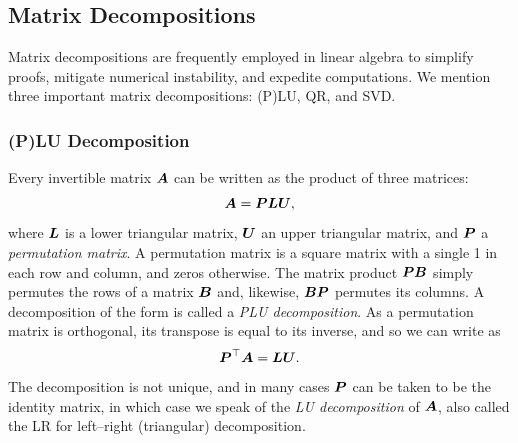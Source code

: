 \subsection{Matrix Decompositions}
Matrix decompositions are frequently employed in linear algebra to simplify proofs, mitigate numerical instability, and expedite computations. We mention three important matrix decompositions: (P)LU, QR, and SVD.

\subsubsection{(P)LU Decomposition}
Every invertible matrix \(\boldsymbol{A}\) can be written as the product of three matrices:
\begin{equation}
	\boldsymbol{A} = \boldsymbol{PLU}, \label{eq:PLUDecomposition}
\end{equation}
where \(\boldsymbol{L}\) is a lower triangular matrix, \(\boldsymbol{U}\) an upper triangular matrix, and \(\boldsymbol{P}\) a \textit{permutation matrix}. A permutation matrix is a square matrix with a single 1 in each row and column, and zeros otherwise. The matrix product \(\boldsymbol{PB}\) simply permutes the rows of a matrix \(\boldsymbol{B}\) and, likewise, \(\boldsymbol{BP}\) permutes its columns. A decomposition of the form  is called a \textit{PLU decomposition}. As a permutation matrix is orthogonal, its transpose is equal to its inverse, and so we can write  as
\begin{equation*}
	\boldsymbol{P}^\top \boldsymbol{A} = \boldsymbol{LU}.
\end{equation*}
The decomposition is not unique, and in many cases \(\boldsymbol{P}\) can be taken to be the identity matrix, in which case we speak of the \textit{LU decomposition} of \(\boldsymbol{A}\), also called the LR for left--right (triangular) decomposition.

